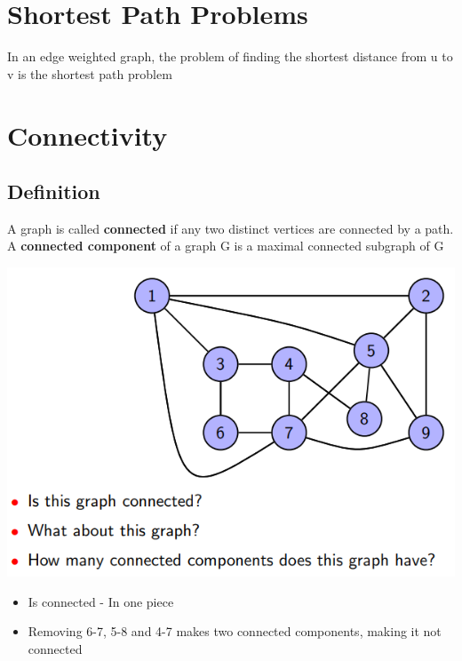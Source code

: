 \documentclass{article}[18pt]
\begin{document}
\section{Shortest Path Problems}
In an edge weighted graph, the problem of finding the shortest distance from u to v is the shortest path problem

\section{Connectivity}
\subsection{Definition}
A graph is called \textbf{connected} if any two distinct vertices are connected by a path. A \textbf{connected component} of a graph G is a maximal connected subgraph of G
\begin{center}
	\includegraphics[scale=0.7]{grapj}
\end{center}
\begin{itemize}
	\item Is connected - In one piece 
	\item Removing 6-7, 5-8 and 4-7 makes two connected components, making it not connected
\end{itemize}
\end{document}
